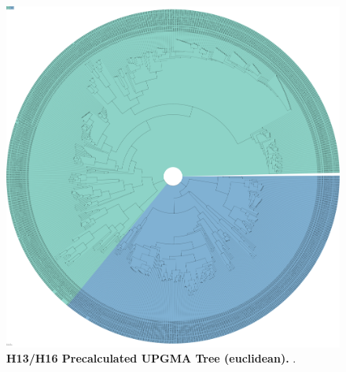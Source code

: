 \begin{figure}[!hbt]
    \centering
    \includegraphics[width=\textwidth]{UMAP/Precalculated_Segment_4_H_Euclidean.pdf}
    \caption[H13/H16 Precalculated \Acrshort{UPGMA} Tree (euclidean)]{\textbf{H13/H16 Precalculated \Acrshort{UPGMA} Tree (euclidean).} .}
    \label{fig:Precalculated_Euclid}
\end{figure}

